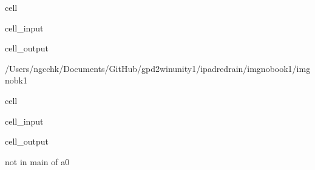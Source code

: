 \documentclass[letterpaper,10pt,english]{jupyterBook}
\begin{document}
\begin{sphinxuseclass}{cell}\begin{sphinxVerbatimInput}

\begin{sphinxuseclass}{cell_input}
\begin{sphinxVerbatim}[commandchars=\\\{\}]
 

\end{sphinxVerbatim}

\end{sphinxuseclass}\end{sphinxVerbatimInput}
\begin{sphinxVerbatimOutput}

\begin{sphinxuseclass}{cell_output}
\begin{sphinxVerbatim}[commandchars=\\\{\}]
/Users/ngcchk/Documents/GitHub/gpd2\PYGZhy{}win\PYGZhy{}unity1/ipadred\PYGZhy{}rain/imgno\PYGZus{}book1/imgnobk1
\end{sphinxVerbatim}

\end{sphinxuseclass}\end{sphinxVerbatimOutput}

\end{sphinxuseclass}
\begin{sphinxuseclass}{cell}\begin{sphinxVerbatimInput}

\begin{sphinxuseclass}{cell_input}
\begin{sphinxVerbatim}[commandchars=\\\{\}]
 
\end{sphinxVerbatim}

\end{sphinxuseclass}\end{sphinxVerbatimInput}
\begin{sphinxVerbatimOutput}

\begin{sphinxuseclass}{cell_output}
\begin{sphinxVerbatim}[commandchars=\\\{\}]
not in main of a0
\end{sphinxVerbatim}

\end{sphinxuseclass}\end{sphinxVerbatimOutput}

\end{sphinxuseclass}
\end{document}
